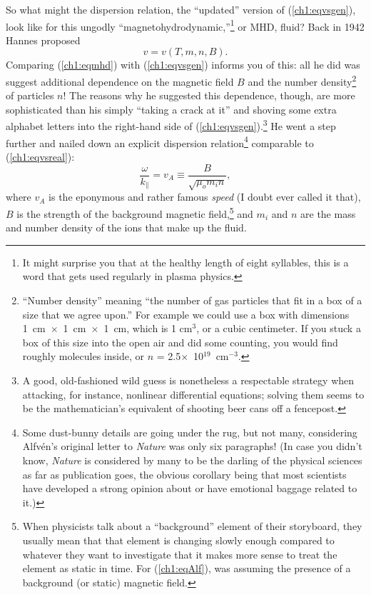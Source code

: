 So what might the dispersion relation, the ``updated'' version of
(\ref{ch1:eqvsgen}), look like for this ungodly
``magnetohydrodynamic,''\footnote{It might surprise you that at the healthy
  length of eight syllables, this is a word that gets used regularly in plasma
  physics.} or MHD, fluid? Back in 1942 Hannes \Alf proposed
\begin{equation}
  \label{ch1:eqmhd}
  v = v ( T, m, n, B).
\end{equation}
Comparing (\ref{ch1:eqmhd}) with (\ref{ch1:eqvsgen}) informs you of this: all he
did was suggest additional dependence on the magnetic field $B$ and the number
density\footnote{``Number density'' meaning ``the number of gas particles that
  fit in a box of a size that we agree upon.'' For example we could use a box
  with dimensions 1~cm~$\times$~1~cm~$\times$~1~cm, which is 1 cm$^3$, or a
  cubic centimeter. If you stuck a box of this size into the open air and did
  some counting, you would find roughly 
  molecules inside, or $n$ = 2.5$\times$~10$^{19}$~cm$^{-3}$.} of particles $n$!
The reasons why he suggested this dependence, though, are more sophisticated
than his simply ``taking a crack at it'' and shoving some extra alphabet letters
into the right-hand side of (\ref{ch1:eqvsgen}).\footnote{A good, old-fashioned
  wild guess is nonetheless a respectable strategy when attacking, for instance,
  nonlinear differential equations; solving them seems to be the mathematician's
  equivalent of shooting beer cans off a fencepost.} He went a step further and
nailed down an explicit dispersion relation\footnote{Some dust-bunny details are
  going under the rug, but not many, considering Alfv\'{e}n's original letter to
  \textsl{Nature} was only six paragraphs! (In case you didn't know,
  \textsl{Nature} is considered by many to be the darling of the physical
  sciences as far as publication goes, the obvious corollary being that most
  scientists have developed a strong opinion about or have emotional baggage
  related to it.)} comparable to (\ref{ch1:eqvsreal}):
\begin{equation}
  \label{ch1:eqAlf}
  \dfrac{\omega}{k_\parallel} = v_A \equiv \frac{B}{\sqrt{\mu_o m_i n}},
\end{equation}
where $v_A$ is the eponymous and rather famous \textsl{\Alf speed} (I doubt \Alf
ever called it that), $B$ is the strength of the background magnetic
field,\footnote{When physicists talk about a ``background'' element of their
  storyboard, they usually mean that that element is changing slowly enough
  compared to whatever they want to investigate that it makes more sense to
  treat the element as static in time. For (\ref{ch1:eqAlf}), \Alf was
  assuming the presence of a background (or static) magnetic field.} and $m_i$
and $n$ are the mass and number density of the ions that make up the fluid.

